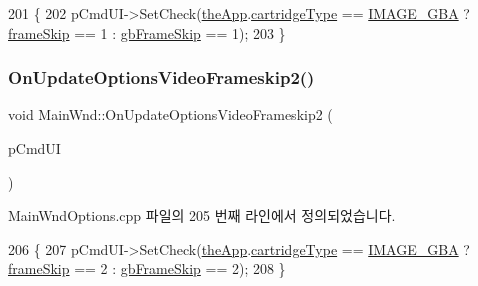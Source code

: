 \begin{DoxyCode}
201 \{
202   pCmdUI->SetCheck(\mbox{\hyperlink{_v_b_a_8cpp_a8095a9d06b37a7efe3723f3218ad8fb3}{theApp}}.\mbox{\hyperlink{class_v_b_a_af300759fcbc7eeb00ce73f956fc5ddb7}{cartridgeType}} == \mbox{\hyperlink{_util_8h_aef8b88d56fdf9a25f990a68d80c014d8a25f0ac1f3a37d568346fedece32e4bfb}{IMAGE\_GBA}} ? 
      \mbox{\hyperlink{_globals_8cpp_a668e22999d7fcea3ed14130fd680b795}{frameSkip}} == 1 : \mbox{\hyperlink{_g_b_8cpp_a2139360d32d74969f470ef05414ecaf8}{gbFrameSkip}} == 1);
203 \}
\end{DoxyCode}
\mbox{\label{class_main_wnd_ab6f8fbd462e7b2079a185074d54c205c}} 
\subsubsection{\texorpdfstring{On\+Update\+Options\+Video\+Frameskip2()}{OnUpdateOptionsVideoFrameskip2()}}
{\footnotesize\ttfamily void Main\+Wnd\+::\+On\+Update\+Options\+Video\+Frameskip2 (\begin{DoxyParamCaption}\item[{C\+Cmd\+UI $\ast$}]{p\+Cmd\+UI }\end{DoxyParamCaption})\hspace{0.3cm}{\ttfamily [protected]}}



Main\+Wnd\+Options.\+cpp 파일의 205 번째 라인에서 정의되었습니다.


\begin{DoxyCode}
206 \{
207   pCmdUI->SetCheck(\mbox{\hyperlink{_v_b_a_8cpp_a8095a9d06b37a7efe3723f3218ad8fb3}{theApp}}.\mbox{\hyperlink{class_v_b_a_af300759fcbc7eeb00ce73f956fc5ddb7}{cartridgeType}} == \mbox{\hyperlink{_util_8h_aef8b88d56fdf9a25f990a68d80c014d8a25f0ac1f3a37d568346fedece32e4bfb}{IMAGE\_GBA}} ? 
      \mbox{\hyperlink{_globals_8cpp_a668e22999d7fcea3ed14130fd680b795}{frameSkip}} == 2 : \mbox{\hyperlink{_g_b_8cpp_a2139360d32d74969f470ef05414ecaf8}{gbFrameSkip}} == 2);
208 \}
\end{DoxyCode}
\mbox{\label{class_main_wnd_a700b4eb8a69599721b04abba60a9aad8}} 
